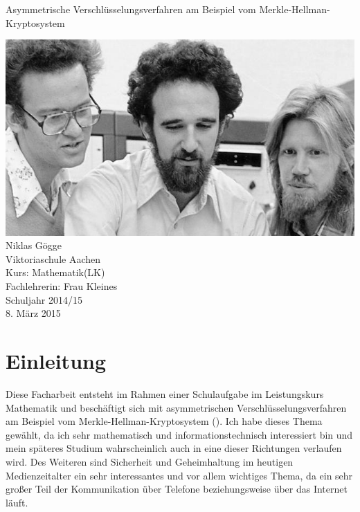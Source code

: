 \documentclass[a4paper,12pt,titlepage]{article}
\author
{
Niklas Gögge\\
Viktoriaschule Aachen\\
Kurs: Mathematik(LK)\\
Fachlehrerin: Frau Kleines\\
Schuljahr 2014/15
}
\begin{document}
\begin{titlepage}
\begin{center}

\LARGE Asymmetrische Verschlüsselungsverfahren am Beispiel vom Merkle-Hellman-Kryptosystem                






\vspace{2cm}
\includegraphics[scale=0.4]{titlepicture.jpg} \\
\vspace{2cm}
\large
Niklas Gögge\\
Viktoriaschule Aachen\\
Kurs: Mathematik(LK)\\
Fachlehrerin: Frau Kleines\\
Schuljahr 2014/15 \\
\vspace{1cm}
8. März 2015
\end{center}
\end{titlepage}
\newpage
\tableofcontents
\newpage

\section{Einleitung}
Diese Facharbeit entsteht im Rahmen einer Schulaufgabe im Leistungskurs Mathematik und
beschäftigt sich mit asymmetrischen Verschlüsselungsverfahren am Beispiel vom
Merkle-Hellman-Kryptosystem (\cite{merklehellman_neer}). Ich habe dieses Thema gewählt, da ich sehr mathematisch und informationstechnisch interessiert bin und mein späteres
Studium wahrscheinlich auch in eine dieser Richtungen verlaufen wird. Des
Weiteren sind Sicherheit und Geheimhaltung im heutigen Medienzeitalter ein sehr
interessantes und vor allem wichtiges Thema, da ein sehr großer Teil der
Kommunikation über Telefone beziehungsweise über das Internet läuft.
\end{document}
